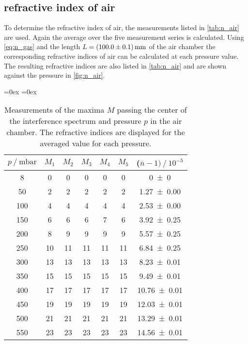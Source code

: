 \subsection{refractive index of air}
To determine the refractive index of air, the measurements listed in \autoref{tab:n_air} are used.
Again the average over the five measurement series is calculated. Using \autoref{eq:n_gas} and the length $L = \qty{100 +- 0.1}{\milli\metre}$ of the air chamber 
the corresponding refractive indices of air can be calculated at each 
pressure value. The resulting refractive indices are also listed in \autoref{tab:n_air} and are shown against the pressure in \autoref{fig:n_air}.
\begin{table}
  \centering
  \aboverulesep=0ex %
  \belowrulesep=0ex %
  \caption{Measurements of the maxima $M$ passing the center of the interference spectrum and pressure $p$ in the air chamber. 
  The refractive indices are displayed for the averaged value for each pressure.}
  \label{tab:n_air}
  \begin{tabular}{c | c c c c c | c}
    \toprule
    {$p \mathbin{/} \unit{\milli\bar}$} & {$M_1$} & {$M_2$} & {$M_3$} & {$M_4$} & {$M_5$} & {($\overline{n} -1) \mathbin{/} 10^{-5}$}\\
    \midrule
    \rule{0pt}{1.1EM}
    {  8} & { 0} & { 0} & { 0} & { 0} & { 0} & \num{0 +-0}\\
    { 50} & { 2} & { 2} & { 2} & { 2} & { 2} & \num{1.27+-0.00}\\
    {100} & { 4} & { 4} & { 4} & { 4} & { 4} & \num{2.53+-0.00}\\
    {150} & { 6} & { 6} & { 6} & { 7} & { 6} & \num{3.92+-0.25}\\
    {200} & { 8} & { 9} & { 9} & { 9} & { 9} & \num{5.57+-0.25}\\
    {250} & {10} & {11} & {11} & {11} & {11} & \num{6.84+-0.25}\\
    {300} & {13} & {13} & {13} & {13} & {13} & \num{8.23+-0.01}\\
    {350} & {15} & {15} & {15} & {15} & {15} & \num{9.49+-0.01}\\
    {400} & {17} & {17} & {17} & {17} & {17} & \num{10.76+-0.01}\\
    {450} & {19} & {19} & {19} & {19} & {19} & \num{12.03+-0.01}\\
    {500} & {21} & {21} & {21} & {21} & {21} & \num{13.29+-0.01}\\
    {550} & {23} & {23} & {23} & {23} & {23} & \num{14.56+-0.01}\\

\end{tabular}
\end{table}
